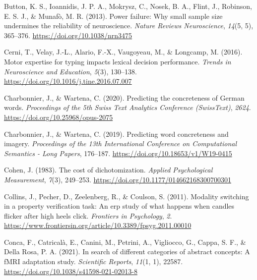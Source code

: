 \documentclass[
  12pt,
  man,floatsintext]{apa7}
\newlength{\cslhangindent}
\newlength{\cslentryspacingunit} %
\newenvironment{CSLReferences}[2] %
 {%
  \setlength{\parindent}{0pt}
  \ifodd #1
  \let\oldpar\par
  \def\par{\hangindent=\cslhangindent\oldpar}
  \fi
  \setlength{\parskip}{#2\cslentryspacingunit}
 }%
 {}
\begin{document}
\begin{CSLReferences}{1}{0}
\leavevmode{}%
Button, K. S., Ioannidis, J. P. A., Mokrysz, C., Nosek, B. A., Flint, J., Robinson, E. S. J., \& Munafò, M. R. (2013). Power failure: {Why} small sample size undermines the reliability of neuroscience. \emph{Nature Reviews Neuroscience}, \emph{14}(5, 5), 365--376. \url{https://doi.org/10.1038/nrn3475}

\leavevmode{}%
Cerni, T., Velay, J.-L., Alario, F.-X., Vaugoyeau, M., \& Longcamp, M. (2016). Motor expertise for typing impacts lexical decision performance. \emph{Trends in Neuroscience and Education}, \emph{5}(3), 130--138. \url{https://doi.org/10.1016/j.tine.2016.07.007}

\leavevmode{}%
Charbonnier, J., \& Wartena, C. (2020). Predicting the concreteness of {German} words. \emph{Proceedings of the 5th {Swiss Text Analytics Conference} ({SwissText})}, \emph{2624}. \url{https://doi.org/10.25968/opus-2075}

\leavevmode{}%
Charbonnier, J., \& Wartena, C. (2019). Predicting word concreteness and imagery. \emph{Proceedings of the 13th {International Conference} on {Computational Semantics} - {Long Papers}}, 176--187. \url{https://doi.org/10.18653/v1/W19-0415}

\leavevmode{}%
Cohen, J. (1983). The cost of dichotomization. \emph{Applied Psychological Measurement}, \emph{7}(3), 249--253. \url{https://doi.org/10.1177/014662168300700301}

\leavevmode{}%
Collins, J., Pecher, D., Zeelenberg, R., \& Coulson, S. (2011). Modality switching in a property verification task: {An} erp study of what happens when candles flicker after high heels click. \emph{Frontiers in Psychology}, \emph{2}. \url{https://www.frontiersin.org/article/10.3389/fpsyg.2011.00010}

\leavevmode{}%
Conca, F., Catricalà, E., Canini, M., Petrini, A., Vigliocco, G., Cappa, S. F., \& Della Rosa, P. A. (2021). In search of different categories of abstract concepts: A {fMRI} adaptation study. \emph{Scientific Reports}, \emph{11}(1, 1), 22587. \url{https://doi.org/10.1038/s41598-021-02013-8}


\end{CSLReferences}
\end{document}
